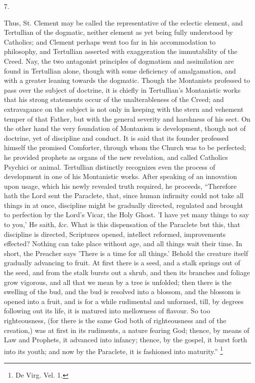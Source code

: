 7.

Thus, St. Clement may be called the representative of
the eclectic element, and Tertullian of the dogmatic,
neither element as yet being fully understood by
Catholics; and Clement perhaps went too far in his
accommodation to philosophy, and Tertullian asserted with
exaggeration the immutability of the Creed. Nay, the two
antagonist principles of dogmatism and assimilation are
found in Tertullian alone, though with some deficiency of
amalgamation, and with a greater leaning towards the
dogmatic. Though the Montanists professed to pass over
the subject of doctrine, it is chiefly in Tertullian's
Montanistic works that his strong statements occur of the
unalterableness of the Creed; and extravagance on the
subject is not only in keeping with the stern and
vehement temper of that Father, but with the general
severity and harshness of his sect. On the other hand the
very foundation of Montanism is development, though not
of doctrine, yet of discipline and conduct. It is said
that its founder professed himself the promised
Comforter, through whom the Church was to be perfected;
he provided prophets as organs of the new
revelation, and called Catholics Psychici or animal.
Tertullian distinctly recognizes even the process of
development in one of his Montanistic works. After
speaking of an innovation upon usage, which his newly
revealed truth required, he proceeds, ``Therefore
hath the Lord sent the Paraclete, that, since human
infirmity could not take all things in at once,
discipline might be gradually directed, regulated and
brought to perfection by the Lord's Vicar, the Holy
Ghost. 'I have yet many things to say to you,' He saith,
\&c. What is this dispensation of the Paraclete but
this, that discipline is directed, Scriptures opened,
intellect reformed, improvements effected? Nothing can
take place without age, and all things wait their time.
In short, the Preacher says 'There is a time for all
things.' Behold the creature itself gradually advancing
to fruit. At first there is a seed, and a stalk springs
out of the seed, and from the stalk bursts out a shrub,
and then its branches and foliage grow vigorous, and all
that we mean by a tree is unfolded; then there is the
swelling of the bud, and the bud is resolved into a
blossom, and the blossom is opened into a fruit, and is
for a while rudimental and unformed, till, by degrees
following out its life, it is matured into mellowness of
flavour. So too righteousness, (for there is the same God
both of righteousness and of the creation,) was at first
in its rudiments, a nature fearing God; thence, by means
of Law and Prophets, it advanced into infancy; thence, by
the gospel, it burst forth into its youth; and now by the
Paraclete, it is fashioned into maturity.'' \footnote{De Virg. Vel. 1.}

